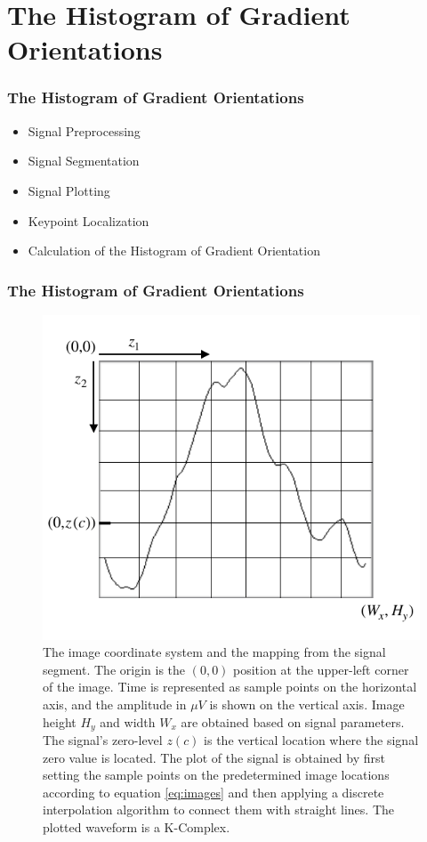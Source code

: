 \documentclass[aspectratio=169]{beamer}
\begin{document}
\section{The Histogram of Gradient Orientations}    
\begin{frame}
\frametitle{The Histogram of Gradient Orientations}
\begin{center}
\begin{itemize}
 \item<1-> Signal Preprocessing
 \item<2-> Signal Segmentation
 \item<3-> Signal Plotting
 \item<4-> Keypoint Localization
 \item<5-> Calculation of the Histogram of Gradient Orientation
\end{itemize}
\end{center}
\end{frame}

\begin{frame}
\frametitle{The Histogram of Gradient Orientations}
\begin{center}
\begin{figure}[h!]
\centering
\includegraphics[scale=1.0]{images/imagecoordinatesystem.pdf}
\caption[Image Coordinate System]{The image coordinate system and the mapping from the signal segment.  The origin is the $(0,0)$ position at the upper-left corner of the image.  Time is represented as sample points on the horizontal axis, and the amplitude in $\mu V$ is shown on the vertical axis. Image height $H_y$ and width $W_x$ are obtained based on signal parameters.  The signal's zero-level $z(c)$ is the vertical location where the signal zero value is located. The plot of the signal is obtained by first setting the sample points on the predetermined image locations according to equation \ref{eq:images} and then applying a discrete interpolation algorithm to connect them with straight lines. The plotted waveform is a K-Complex.}
\label{fig:imagecoordinatesystem}
\end{figure}
\end{center}
\end{frame}
\end{document}
